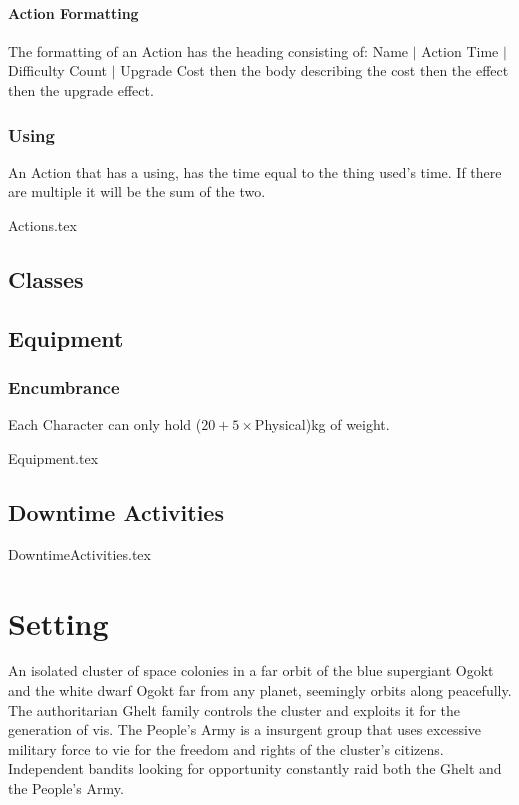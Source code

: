 \documentclass[a4paper,12pt,oneside]{book}
\begin{document}
            \subsubsection{Action Formatting}
                The formatting of an Action has the heading consisting of: Name $\vert$ Action Time $\vert$ Difficulty Count $\vert$ Upgrade Cost then the body describing the cost then the effect then the upgrade effect.

            \subsection{Using}
                An Action that has a using, has the time equal to the thing used's time. If there are multiple it will be the sum of the two.

            {Actions.tex}
                
        \section{Classes}
        \section{Equipment}
            \subsection{Encumbrance}
                Each Character can only hold ($20 + 5\times$Physical)kg of weight.

            {Equipment.tex}
        \section{Downtime Activities}
            {DowntimeActivities.tex}

    \chapter{Setting}
        An isolated cluster of space colonies in a far orbit of the blue supergiant \alpha Ogokt and the white dwarf \beta Ogokt far from any planet, seemingly orbits along peacefully. The authoritarian Ghelt family controls the cluster and exploits it for the generation of vis. The People's Army is a insurgent group that uses excessive military force to vie for the freedom and rights of the cluster's citizens. Independent bandits looking for opportunity constantly raid both the Ghelt and the People's Army.
\end{document}
